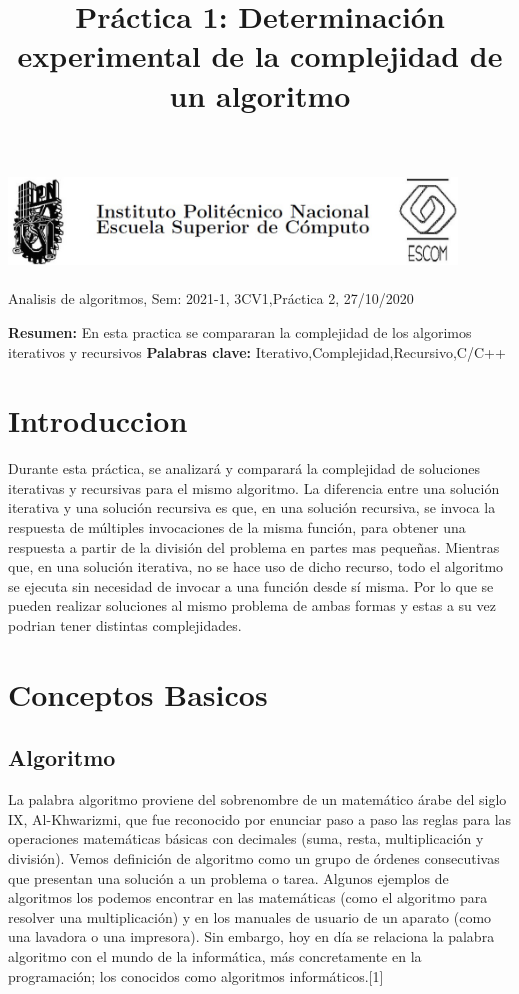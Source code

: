 \documentclass[spanish]{article}
\title {Práctica 1: Determinación experimental de la complejidad de un algoritmo}
\begin{document}
	\centerline{\includegraphics[width=450px,height=100px]{header}}
	\centerline{Analisis de algoritmos, Sem: 2021-1, 3CV1,Práctica  2, 27/10/2020}
	\centerline{}
	\bigskip
	\justify
	\textbf{Resumen:}	
	En esta practica se compararan la complejidad de los algorimos iterativos y recursivos
	\textbf{Palabras clave:}
	Iterativo,Complejidad,Recursivo,C/C++
	\section{Introduccion}
	Durante esta práctica, se analizará y comparará la complejidad de soluciones iterativas y recursivas para el mismo algoritmo. La diferencia entre una solución iterativa y una solución recursiva es que, en una solución recursiva, se invoca la respuesta de múltiples invocaciones de la misma función, para obtener una respuesta a partir de la división del problema en partes mas pequeñas. Mientras que, en una solución iterativa, no se hace uso de dicho recurso, todo el algoritmo se ejecuta sin necesidad de invocar a una función desde sí misma. Por lo que se pueden realizar soluciones al mismo problema de ambas formas y estas a su vez podrian tener distintas complejidades.
	\section{Conceptos Basicos}
	\subsection{Algoritmo}
	La palabra algoritmo proviene del sobrenombre de un matemático árabe del siglo IX, Al-Khwarizmi, que fue reconocido por enunciar paso a paso las reglas para las operaciones matemáticas básicas con decimales (suma, resta, multiplicación y división).	
	Vemos definición de algoritmo como un grupo de órdenes consecutivas que presentan una solución a un problema o tarea. Algunos ejemplos de algoritmos los podemos encontrar en las matemáticas (como el algoritmo para resolver una multiplicación) y en los manuales de usuario de un aparato (como una lavadora o una impresora).	
	Sin embargo, hoy en día se relaciona la palabra algoritmo con el mundo de la informática, más concretamente en la programación; los conocidos como algoritmos informáticos.[1]
\end{document}

